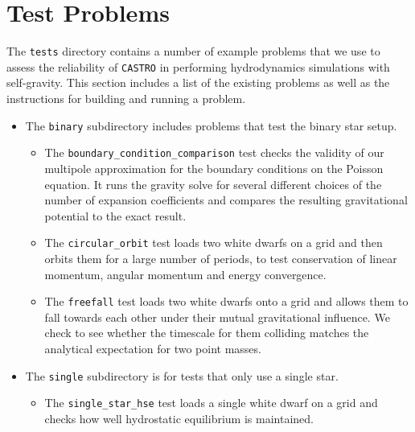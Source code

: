\documentclass[12pt]{book}
\begin{document}
\chapter{Test Problems}

The \texttt{tests} directory contains a number of example problems that we use
to assess the reliability of \texttt{CASTRO} in performing hydrodynamics simulations 
with self-gravity. This section includes a list of the existing problems 
as well as the instructions for building and running a problem.

\begin{itemize}
  \item The \texttt{binary} subdirectory includes problems that test the binary star setup.
  \begin{itemize}
    \item The \texttt{boundary\_condition\_comparison} test checks the validity of our 
      multipole approximation for the boundary conditions on the Poisson equation. It runs
      the gravity solve for several different choices of the number of expansion coefficients
      and compares the resulting gravitational potential to the exact result.
    \item The \texttt{circular\_orbit} test loads two white dwarfs on a grid and then orbits
      them for a large number of periods, to test conservation of linear momentum,
      angular momentum and energy convergence.
    \item The \texttt{freefall} test loads two white dwarfs onto a grid and allows them to fall towards
      each other under their mutual gravitational influence. We check to see whether the timescale for them
      colliding matches the analytical expectation for two point masses.
  \end{itemize}
  
  \item The \texttt{single} subdirectory is for tests that only use a single star.
  \begin{itemize}
    \item The \texttt{single\_star\_hse} test loads a single white dwarf on a grid and checks how well 
      hydrostatic equilibrium is maintained.
  \end{itemize}


\end{itemize}
\end{document}
